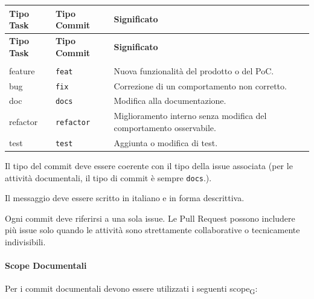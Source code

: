 \begin{xltabular}{\textwidth}{
    >{\raggedright\arraybackslash}p{3cm}
    >{\raggedright\arraybackslash}p{3cm}
    >{\raggedright\arraybackslash}X
}
    \toprule
    \textbf{Tipo Task} & \textbf{Tipo Commit} & \textbf{Significato} \\
    \midrule
    \endfirsthead

    \toprule
    \textbf{Tipo Task} & \textbf{Tipo Commit} & \textbf{Significato} \\
    \midrule
    \endhead

    \midrule
     \\
    \endfoot

    \bottomrule
    \endlastfoot

    feature
    & \texttt{feat}
    & Nuova funzionalità del prodotto o del PoC. \\

    bug
    & \texttt{fix}
    & Correzione di un comportamento non corretto. \\

    doc
    & \texttt{docs}
    & Modifica alla documentazione. \\

    refactor
    & \texttt{refactor}
    & Miglioramento interno senza modifica del comportamento osservabile. \\

    test
    & \texttt{test}
    & Aggiunta o modifica di test. \\

\end{xltabular}

Il tipo del commit deve essere coerente con il tipo della issue associata (per le attività documentali, il tipo di commit è sempre \texttt{docs}.).

Il messaggio deve essere scritto in italiano e in forma descrittiva.

Ogni commit deve riferirsi a una sola issue. Le Pull Request possono includere più
issue solo quando le attività sono strettamente collaborative o tecnicamente
indivisibili.

\paragraph{Scope Documentali}

Per i commit documentali devono essere utilizzati i seguenti scope\textsubscript{G}:

